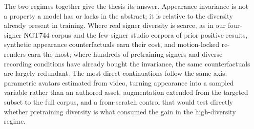 The two regimes together give the thesis its answer. Appearance
invariance is not a property a model has or lacks in the abstract; it is
relative to the diversity already present in training. Where real signer
diversity is scarce, as in our four-signer NGT744 corpus and the
few-signer studio corpora of prior positive results, synthetic
appearance counterfactuals earn their cost, and motion-locked
re-renders earn the most; where hundreds of pretraining signers and diverse
recording conditions have already bought the invariance, the same
counterfactuals are largely redundant.
The most direct continuations follow the same axis: parametric avatars
estimated from video, turning appearance into a sampled variable rather
than an authored asset, augmentation extended from the targeted subset to
the full corpus, and a from-scratch control that would test directly
whether pretraining diversity is what consumed the gain in the
high-diversity regime.
